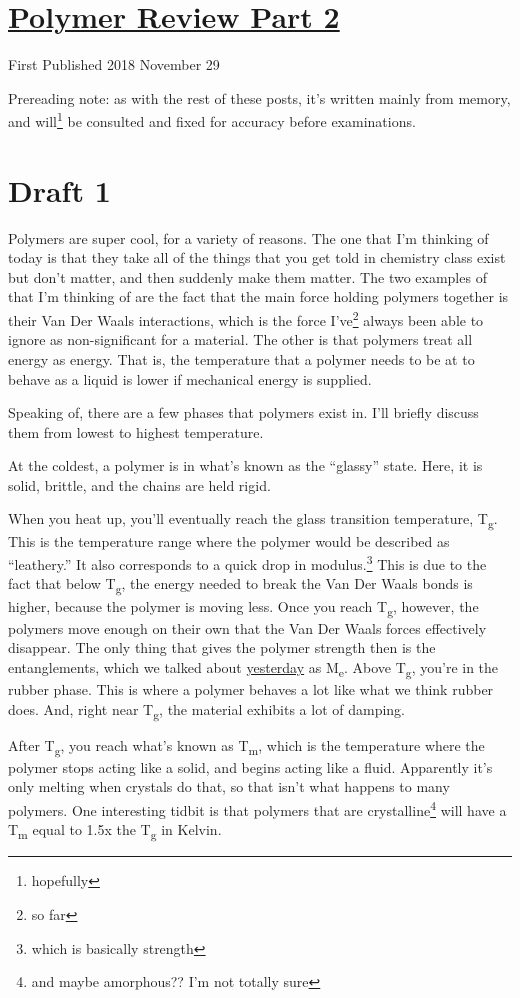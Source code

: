 \documentclass[12pt]{article}[titlepage]
\newcommand{\say}[1]{``#1''}
\newcommand{\1}{\={a}}
\newcommand{\2}{\={e}}
\newcommand{\3}{\={\i}}
\newcommand{\4}{\=o}
\newcommand{\5}{\=u}
\newcommand{\6}{\={A}}
\newcommand{\sub}[1]{\textsubscript{#1}}
\renewcommand{\,}{\textsuperscript{,}}
\begin{document}
\doublespacing
\section{\href{polymer-2.html}{Polymer Review Part 2}}
First Published 2018 November 29

Prereading note: as with the rest of these posts, it's written mainly from memory, and will\footnote{hopefully} be consulted and fixed for accuracy before examinations.
\section{Draft 1}
Polymers are super cool, for a variety of reasons.
The one that I'm thinking of today is that they take all of the things that you get told in chemistry class exist but don't matter, and then suddenly make them matter.
The two examples of that I'm thinking of are the fact that the main force holding polymers together is their Van Der Waals interactions, which is the force I've\footnote{so far} always been able to ignore as non-significant for a material.
The other is that polymers treat all energy as energy.
That is, the temperature that a polymer needs to be at to behave as a liquid is lower if mechanical energy is supplied.

Speaking of, there are a few phases that polymers exist in.
I'll briefly discuss them from lowest to highest temperature.

At the coldest, a polymer is in what's known as the \say{glassy} state.
Here, it is solid, brittle, and the chains are held rigid.

When you heat up, you'll eventually reach the glass transition temperature, T\sub{g}.
This is the temperature range where the polymer would be described as \say{leathery.}
It also corresponds to a quick drop in modulus.\footnote{which is basically strength}
This is due to the fact that below T\sub{g}, the energy needed to break the Van Der Waals bonds is higher, because the polymer is moving less.
Once you reach T\sub{g}, however, the polymers move enough on their own that the Van Der Waals forces effectively disappear.
The only thing that gives the polymer strength then is the entanglements, which we talked about \href{polymer-1.html}{yesterday} as M\sub{e}.
Above T\sub{g}, you're in the rubber phase.
This is where a polymer behaves a lot like what we think rubber does.
And, right near T\sub{g}, the material exhibits a lot of damping.

After T\sub{g}, you reach what's known as T\sub{m}, which is the temperature where the polymer stops acting like a solid, and begins acting like a fluid.
Apparently it's only melting when crystals do that, so that isn't what happens to many polymers.
One interesting tidbit is that polymers that are crystalline\footnote{and maybe amorphous?? I'm not totally sure} will have a T\sub{m} equal to 1.5x the T\sub{g} in Kelvin.
\end{document}
